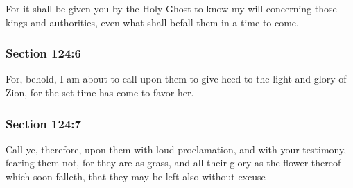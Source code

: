 		For it shall be given you by the Holy Ghost to know my will concerning those kings and authorities, even what shall befall them in a time to come.


	\subsubsection{Section 124:6} %
		\label{DC124-6}

		For, behold, I am about to call upon them to give heed to the light and glory of Zion, for the set time has come to favor her.


	\subsubsection{Section 124:7} %
		\label{DC124-7}

		Call ye, therefore, upon them with loud proclamation, and with your testimony, fearing them not, for they are as grass, and all their glory as the flower thereof which soon falleth, that they may be left also without excuse---



